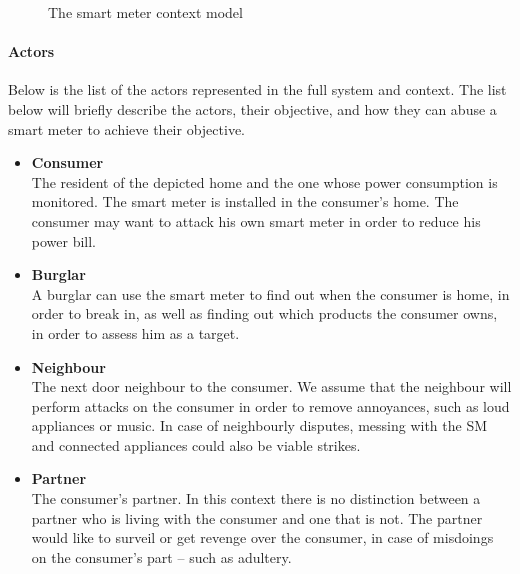 \begin{figure}[h]
  \centering
  
  \caption{The smart meter context model}
  \label{contextual:sm_model}
\end{figure}

\paragraph{Actors}\label{contextActors}
Below is the list of the actors represented in the full system and context.
The list below will briefly describe the actors, their objective, and how they can abuse a smart meter to achieve their objective.
\begin{itemize}
\item \textbf{Consumer}\\
The resident of the depicted home and the one whose power consumption is monitored.
The smart meter is installed in the consumer's home.
The consumer may want to attack his own smart meter in order to reduce his power bill.
\item \textbf{Burglar}\\ A burglar can use the smart meter to find out when the consumer is home, in order to break in, as well as finding out which products the consumer owns, in order to assess him as a target.
\item \textbf{Neighbour}\\
The next door neighbour to the consumer.
We assume that the neighbour will perform attacks on the consumer in order to remove annoyances, such as loud appliances or music.
In case of neighbourly disputes, messing with the SM and connected appliances could also be viable strikes.
\item \textbf{Partner}\\
The consumer's partner.
In this context there is no distinction between a partner who is living with the consumer and one that is not.
The partner would like to surveil or get revenge over the consumer, in case of misdoings on the consumer's part -- such as adultery.


\end{itemize}
